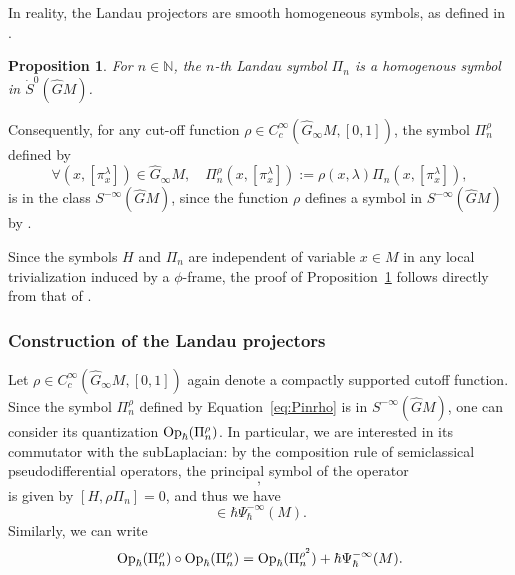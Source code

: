 \documentclass[12pt,a4paper]{amsart}
\theoremstyle{plain}
\newtheorem{proposition}[theorem]{Proposition}
\theoremstyle{definition}
\theoremstyle{remark}
\numberwithin{equation}{section}
\theoremstyle{definition}
\def\N{{\mathbb N}}%
\def \Op{{\rm Op}}
\def \Ghat{\widehat{G}}
\numberwithin{equation}{section}
\begin{document}
In reality, the Landau projectors are smooth homogeneous symbols, as defined in \cite[Section 5.5.1]{FFF24}.

\begin{proposition}
    \label{prop:Pinsmoothsym}
    For $n\in\N$, the $n$-th Landau symbol $\Pi_n$ is a homogenous symbol in $\dot{S}^0(\Ghat M)$.
\end{proposition}

Consequently, for any cut-off function $\rho\in C_c^\infty(\Ghat_\infty M,[0,1])$, the symbol $\Pi_{n}^\rho$ defined by 
\begin{equation}
    \label{eq:Pinrho}
    \forall (x,[\pi_x^\lambda])\in \Ghat_\infty M,\quad \Pi_{n}^\rho(x,[\pi_x^\lambda]) := \rho(x,\lambda)\Pi_n(x,[\pi_x^\lambda]),
\end{equation}
is in the class $S^{-\infty}(\Ghat M)$, since the function $\rho$ defines a symbol in $S^{-\infty}(\Ghat M)$ by \cite[Theorem 6.5.1]{FR}. 

Since the symbols $H$ and $\Pi_n$ are independent of variable $x\in M$ in any local trivialization induced by a $\phi$-frame, the proof of Proposition~\ref{prop:Pinsmoothsym} follows directly from that of \cite[Proposition 3.6]{FKF21}.

\subsubsection{Construction of the Landau projectors} 

Let $\rho\in C_c^\infty(\Ghat_\infty M,[0,1])$ again denote a compactly supported cutoff function. Since the symbol $\Pi_n^\rho$ defined by Equation~\eqref{eq:Pinrho} is in $S^{-\infty}(\Ghat M)$, one can consider its quantization $\Op_\hbar(\Pi_n^\rho)$. In particular, we are interested in its commutator with the subLaplacian: by the composition rule of semiclassical pseudodifferential operators, the principal symbol
of the operator
\begin{equation*}
    [-\hbar^2 \Delta_{\rm sR},\Op_\hbar(\Pi_n^\rho)],
\end{equation*}
is given by $[H,\rho \Pi_n] = 0$, and thus we have
\begin{equation*}
    [-\hbar^2 \Delta_{\rm sR},\Op_\hbar(\Pi_n^\rho)] \in \hbar \Psi_\hbar^{-\infty}(M).
    \end{equation*} 
Similarly, we can write
\begin{equation*}
    \Op_\hbar(\Pi_n^\rho)\circ \Op_\hbar(\Pi_n^\rho)=\Op_\hbar(\Pi_n^{\rho^2}) + \hbar\Psi_\hbar^{-\infty}(M).
\end{equation*}
\end{document}
